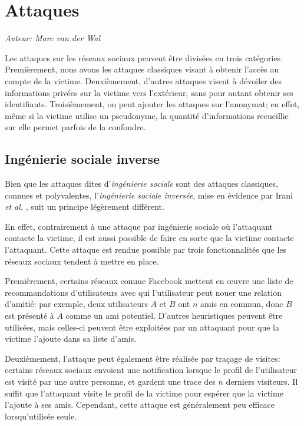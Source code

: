 \section{Attaques}

\begin{flushright}\textit{Auteur: Marc van der Wal}\end{flushright}

Les attaques sur les réseaux sociaux peuvent être divisées en trois catégories.
Premièrement, nous avons les attaques classiques visant à obtenir l'accès au
compte de la victime.  Deuxièmement, d'autres attaques visent à dévoiler des
informations privées sur la victime vers l'extérieur, sans pour autant obtenir
ses identifiants.  Troisièmement, on peut ajouter les attaques sur l'anonymat;
en effet, même si la victime utilise un pseudonyme, la quantité d'informations
recueillie sur elle permet parfois de la confondre.

\subsection{Ingénierie sociale inverse}

Bien que les attaques dites d'\emph{ingénierie sociale} sont des attaques
classiques, connues et polyvalentes, l'\textit{ingénierie sociale inversée},
mise en évidence par Irani \textit{et al.} \cite{dan11}, suit un principe
légèrement différent.

En effet, contrairement à une attaque par ingénierie sociale où l'attaquant
contacte la victime, il est aussi possible de faire en sorte que la victime
contacte l'attaquant.  Cette attaque est rendue possible par trois
fonctionnalités que les réseaux sociaux tendent à mettre en place.

Premièrement, certains réseaux comme Facebook mettent en œuvre une liste de
recommandations d'utilisateurs avec qui l'utilisateur peut nouer une relation
d'amitié: par exemple, deux utilisateurs $A$ et $B$ ont $n$ amis en commun, donc
$B$ est présenté à $A$ comme un ami potentiel.  D'autres heuristiques peuvent
être utilisées, mais celles-ci peuvent être exploitées par un attaquant pour que
la victime l'ajoute dans sa liste d'amis.

Deuxièmement, l'attaque peut également être réalisée par traçage de visites:
certains réseaux sociaux envoient une notification lorsque le profil de
l'utilisateur est visité par une autre personne, et gardent une trace des $n$
derniers visiteurs.  Il suffit que l'attaquant visite le profil de la victime
pour espérer que la victime l'ajoute à ses amis.  Cependant, cette attaque est
généralement peu efficace lorsqu'utilisée seule.

